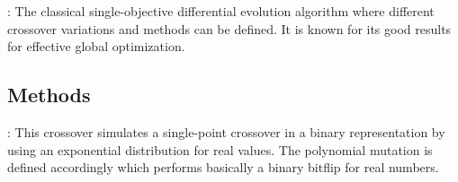\documentclass[letterpaper,10pt,english]{sphinxhowto}
\begin{document}
 \label{\detokenize{index:id5}}{\hyperref[\detokenize{index:price-2005-dep-1121631}]{\sphinxcrossref{{[}5{]}}}}: The classical single-objective
differential evolution algorithm where different crossover variations
and methods can be defined. It is known for its good results for
effective global optimization.


\subsection{Methods}
\label{\detokenize{index:methods}}
 \label{\detokenize{index:id6}}{\hyperref[\detokenize{index:deb-2007-ssb-1276958-1277190}]{\sphinxcrossref{{[}6{]}}}}: This crossover simulates a
single-point crossover in a binary representation by using an
exponential distribution for real values. The polynomial mutation is
defined accordingly which performs basically a binary bitflip for real
numbers.
\end{document}
